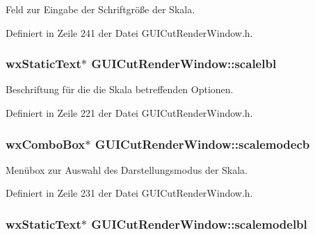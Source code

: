 Feld zur Eingabe der Schriftgröße der Skala. 



Definiert in Zeile 241 der Datei G\-U\-I\-Cut\-Render\-Window.\-h.

\hypertarget{classGUICutRenderWindow_a3c1e80a372d6eaacd4f6ca71a788c9fd}{
\subsubsection[{scalelbl}]{\setlength{\rightskip}{0pt plus 5cm}wx\-Static\-Text$\ast$ G\-U\-I\-Cut\-Render\-Window\-::scalelbl\hspace{0.3cm}{\ttfamily [private]}}}\label{classGUICutRenderWindow_a3c1e80a372d6eaacd4f6ca71a788c9fd}


Beschriftung für die die Skala betreffenden Optionen. 



Definiert in Zeile 221 der Datei G\-U\-I\-Cut\-Render\-Window.\-h.

\hypertarget{classGUICutRenderWindow_af535e1e80e14178ff5c05707261a183d}{
\subsubsection[{scalemodecb}]{\setlength{\rightskip}{0pt plus 5cm}wx\-Combo\-Box$\ast$ G\-U\-I\-Cut\-Render\-Window\-::scalemodecb\hspace{0.3cm}{\ttfamily [private]}}}\label{classGUICutRenderWindow_af535e1e80e14178ff5c05707261a183d}


Menübox zur Auswahl des Darstellungsmodus der Skala. 



Definiert in Zeile 231 der Datei G\-U\-I\-Cut\-Render\-Window.\-h.

\hypertarget{classGUICutRenderWindow_a2a3f0b64122aff2f336f94fb72b3b8ac}{
\subsubsection[{scalemodelbl}]{\setlength{\rightskip}{0pt plus 5cm}wx\-Static\-Text$\ast$ G\-U\-I\-Cut\-Render\-Window\-::scalemodelbl\hspace{0.3cm}{\ttfamily [private]}}}\label{classGUICutRenderWindow_a2a3f0b64122aff2f336f94fb72b3b8ac}


